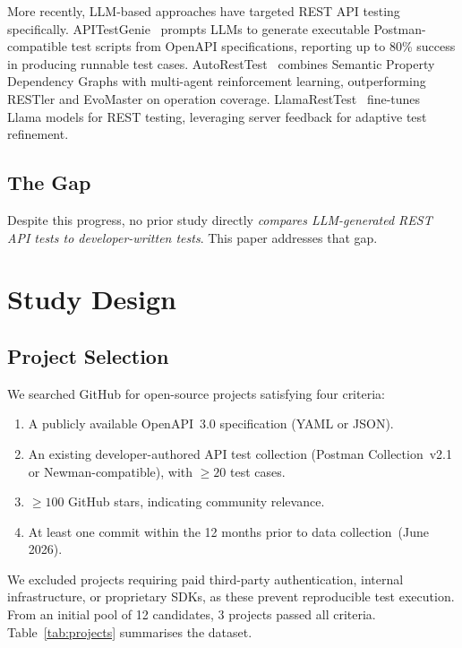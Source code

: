\documentclass[sigconf,review,anonymous=false]{acmart}
\begin{document}
More recently, LLM-based approaches have targeted REST API testing
specifically. APITestGenie~\cite{Pereira2024} prompts LLMs to generate
executable Postman-compatible test scripts from OpenAPI specifications,
reporting up to 80\% success in producing runnable test cases.
AutoRestTest~\cite{Stennett2025} combines Semantic Property Dependency Graphs
with multi-agent reinforcement learning, outperforming RESTler and
EvoMaster on operation coverage. LlamaRestTest~\cite{Kim2025} fine-tunes
Llama models for REST testing, leveraging server feedback for adaptive
test refinement.

\subsection{The Gap}
Despite this progress, no prior study directly \emph{compares LLM-generated
REST API tests to developer-written tests}. This paper addresses that gap.

\section{Study Design}\label{sec:method}

\subsection{Project Selection}
We searched GitHub for open-source projects satisfying four criteria:
\begin{enumerate}
  \item A publicly available OpenAPI~3.0 specification (YAML or JSON).
  \item An existing developer-authored API test collection (Postman
    Collection~v2.1 or Newman-compatible), with $\geq 20$ test cases.
  \item $\geq 100$ GitHub stars, indicating community relevance.
  \item At least one commit within the 12 months prior to data
    collection~(June 2026).
\end{enumerate}

We excluded projects requiring paid third-party authentication, internal
infrastructure, or proprietary SDKs, as these prevent reproducible
test execution. From an initial pool of 12 candidates, 3
projects passed all criteria.
Table~\ref{tab:projects} summarises the dataset.
\end{document}
